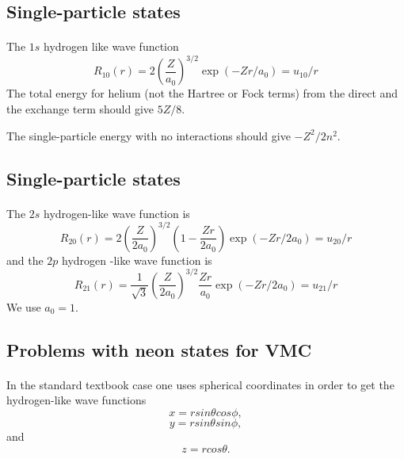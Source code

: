 \documentclass[%
twoside,                 %
final,                   %
10pt]{article}
\begin{document}
\subsection*{Single-particle states}

\paragraph{}
The $1s$ hydrogen like wave function
\[
R_{10}(r) =  2\left(\frac{Z}{a_0}\right)^{3/2}\exp{(-Zr/a_0)}= u_{10}/r 
\]
The total energy for helium (not the Hartree or Fock terms) from  the direct and the exchange term should give $5Z/8$.

The single-particle energy with no interactions should give $-Z^2/2n^2$.




\subsection*{Single-particle states}

\paragraph{}
The $2s$ hydrogen-like wave function is
\[
R_{20}(r) =  2\left(\frac{Z}{2a_0}\right)^{3/2}\left(1-\frac{Zr}{2a_0}\right)\exp{(-Zr/2a_0)}= u_{20}/r 
\]
and the $2p$ hydrogen -like wave function is
\[
R_{21}(r) =  \frac{1}{\sqrt{3}}\left(\frac{Z}{2a_0}\right)^{3/2}\frac{Zr}{a_0}\exp{(-Zr/2a_0)}= u_{21}/r 
\]
We use $a_0=1$.





\subsection*{Problems with neon states for VMC}

\paragraph{}
In the standard textbook case one uses spherical coordinates  in order to get the hydrogen-like wave functions
     \[
        x=rsin\theta cos\phi,  
      \]
      \[
        y=rsin\theta sin\phi,
     \]
and
     \[
        z=rcos\theta.
     \]
\end{document}
